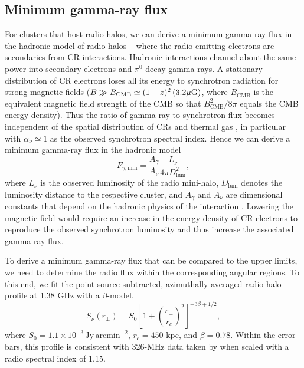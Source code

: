 \documentclass[12pt,manuscript]{aastex}
\newcommand{\rmn}{\mathrm}
\newcommand{\dps}{\displaystyle}
\begin{document}
%
%

\subsection{Minimum gamma-ray flux}
\label{sec:Fmin}

For clusters that host radio halos, we can derive a minimum gamma-ray flux in the hadronic model of
radio halos -- where the radio-emitting electrons are secondaries from CR interactions.  Hadronic
interactions channel about the same power into secondary electrons and $\pi^{0}$-decay gamma rays. A
stationary distribution of CR electrons loses all its energy to synchrotron radiation for strong
magnetic fields ($B \gg B_\rmn{CMB} \simeq (1+z)^2\,(3.2 \mu{\rm G})$, 
where $B_\rmn{CMB}$ is the equivalent magnetic
field strength of the CMB so that $B_\rmn{CMB}^2/8\pi$ equals the CMB energy density). Thus the
ratio of gamma-ray to synchrotron flux becomes independent of the spatial distribution of CRs and
thermal gas \citep{article:Voelk:1989, article:Pohl:1994, article:Pfrommer:2008}, in particular with
$\alpha_{\nu}\simeq 1$ as the observed synchrotron spectral index.  Hence we can derive a minimum
gamma-ray flux in the hadronic model
\begin{equation}
\label{eq:Fmin}
F_{\gamma,\rmn{min}} = \frac{\dps A_{\gamma}}{\dps A_{\nu}}\frac{\dps L_{\nu}}{\dps 4\pi D_{\rmn{lum}}^{2}},
\end{equation}
where $L_{\nu}$ is the observed luminosity of the radio mini-halo, $D_{\rmn{lum}}$ denotes the
luminosity distance to the respective cluster, and $A_\gamma$ and $A_\nu$ are dimensional constants
that depend on the hadronic physics of the interaction \citep{article:Pfrommer:2008,
Pfrommer_etal:2008}. Lowering the magnetic field would require an increase in the energy density of
CR electrons to reproduce the observed synchrotron luminosity and thus increase the associated
gamma-ray flux.

To derive a minimum gamma-ray flux that can be compared to the upper limits, we need to determine the
radio flux within the corresponding angular regions. To this end, we fit the
point-source-subtracted, azimuthally-averaged radio-halo profile at 1.38 GHz
\citep{article:Deiss_etal:1997} with a $\beta$-model,
\begin{equation}
\label{beta}
 S_{\nu} (r_{\bot})= S_{0} \left[ 1 + \left( \frac{r_{\bot}}{r_{\rmn{c}}}\right)^{2}\right]^{-3\beta + 1/2},
\end{equation}
where $S_{0} = 1.1 \times 10^{-3}\,\rmn{Jy\,arcmin}^{-2}$, $r_{\rmn{c}} = 450$ kpc, and
$\beta = 0.78$. Within the error bars, this profile is consistent with 326-MHz data taken by
\citet{article:Govoni_etal:2001} when scaled with a radio spectral index of 1.15.
\end{document}
